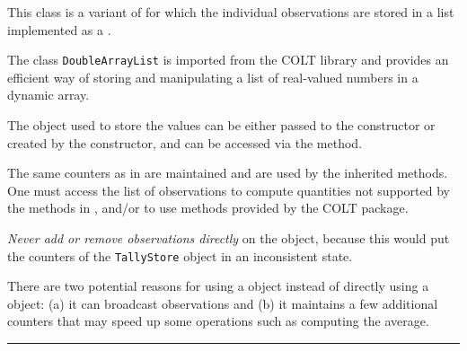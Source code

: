 
This class is a variant of  for which the individual
observations are stored in a list implemented as a
.
\begin{latexonly}%
The class \texttt{DoubleArrayList} is imported from the COLT library and
provides an efficient way of storing and manipulating a list of
real-valued numbers in a dynamic array.
\end{latexonly}%
The  object used to
store the values can be either passed to the constructor or created by
the constructor, and can be accessed via the
 method.

The same counters as in  are maintained and are used by
the inherited methods.  One must access the list of observations
to compute quantities not supported by the methods in
, and/or to use methods provided by the COLT package.


\emph{Never add or remove observations directly} on the
 object,
because this would put the counters of the \texttt{TallyStore} object in an
inconsistent state.

There are two potential reasons for using a  object
instead of directly using a  object:
(a) it can broadcast observations and
(b) it maintains a few additional counters that may speed up some operations
such as computing the average.



\bigskip\hrule

